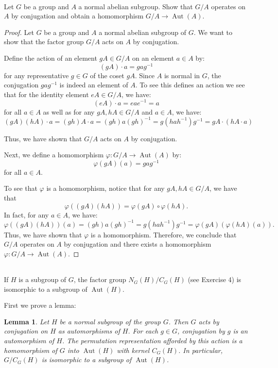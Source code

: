 \documentclass{article}
\newtheorem{lemma}[theorem]{Lemma}
\begin{document}
\newpage
\begin{problem}[II.4.1] \\
    Let $G$ be a group and $A$ a normal abelian subgroup. Show that $G/A$ operates on $A$ by conjugation and obtain a homomorphism $G/A \to \operatorname{Aut}(A)$.
\end{problem}



\begin{proof}
    Let $G$ be a group and $A$ a normal abelian subgroup of $G$. We want to show that the factor group $G/A$ acts on $A$ by conjugation.

    Define the action of an element $gA \in G/A$ on an element $a \in A$ by:
    \[
        (gA) \cdot a = gag^{-1}
    \]
    for any representative $g \in G$ of the coset $gA$. Since $A$ is normal in $G$, the conjugation $gag^{-1}$ is indeed an element of $A$.
    To see this defines an action we see that for the identity element $eA \in G/A$, we have:
    \[
        (eA) \cdot a = eae^{-1} = a
    \]
    for all $a \in A$ as well as for any $gA, hA \in G/A$ and $a \in A$, we have:
    \[
        (gA)(hA) \cdot a = (gh)A \cdot a = (gh)a(gh)^{-1} = g(ha h^{-1})g^{-1} = gA \cdot (hA \cdot a)
    \]

    Thus, we have shown that $G/A$ acts on $A$ by conjugation.

    Next, we define a homomorphism $\varphi: G/A \to \operatorname{Aut}(A)$ by:
    \[
        \varphi(gA)(a) = gag^{-1}
    \]
    for all $a \in A$. 

    To see that $\varphi$ is a homomorphism, notice that for any $gA, hA \in G/A$, we have that
    \[
        \varphi((gA)(hA)) = \varphi(gA) \circ \varphi(hA).
    \]
    In fact, for any $a \in A$, we have:
    \[
        \varphi((gA)(hA))(a) = (gh)a(gh)^{-1} = g(ha h^{-1})g^{-1} = \varphi(gA)(\varphi(hA)(a)).
    \]
    Thus, we have shown that $\varphi$ is a homomorphism. Therefore, we conclude that $G/A$ operates on $A$ by conjugation and there exists a homomorphism $\varphi: G/A \to \operatorname{Aut}(A)$.
\end{proof}



\newpage
\begin{problem}[II.4.5] \\
    If $H$ is a subgroup of $G$, the factor group $N_G(H)/C_G(H)$ (see Exercise 4) is isomorphic to a subgroup of $\operatorname{Aut}(H)$.
\end{problem}


First we prove a lemma: \\
\begin{lemma}
    Let $H$ be a normal subgroup of the group $G$. Then $G$ acts by conjugation on $H$ as automorphisms of $H$. For each $g \in G$, conjugation by $g$ is an automorphism of $H$. The permutation representation afforded by this action is a homomorphism of $G$ into $\operatorname{Aut}(H)$ with kernel $C_G(H)$. In particular, $G / C_G(H)$ is isomorphic to a subgroup of $\operatorname{Aut}(H)$.
\end{lemma}
\end{document}

